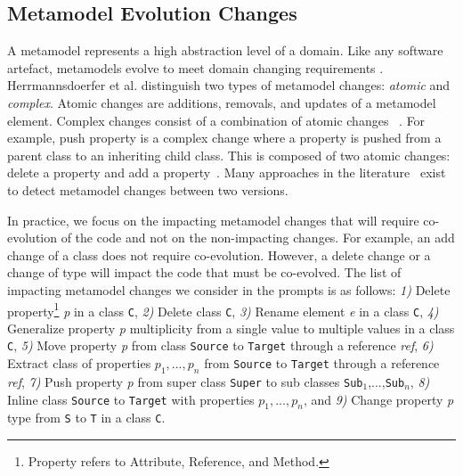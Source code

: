 \subsection{Metamodel Evolution Changes}
\label{mmchanges}
A metamodel represents a high abstraction level of a domain.
Like any software artefact, metamodels evolve to meet domain changing requirements \cite{mens2008introduction}.
Herrmannsdoerfer et al. \cite{Herrmannsdoerfer2011} distinguish two types of metamodel changes: \emph{atomic} and \emph{complex}. Atomic changes are additions, removals, and updates of a metamodel element. Complex changes consist of a combination of atomic changes ~\cite{vermolen2011reconstructing,khelladi2015detecting}. 
%
For example, push property is a complex change where a property is pushed from a parent class to an inheriting child class. This is composed of two atomic changes: delete a property and add a property~\cite{Herrmannsdoerfer2011}. 
Many approaches in the literature~\cite{Alter2015, williams2012searching,cicchetti2009managing,langer2013posteriori,vermolen2011reconstructing,Khelladi2016,bettini2022executable} exist to detect metamodel changes between two versions. 

In practice, we focus on the impacting metamodel changes that will require co-evolution of the code and not on the non-impacting changes. For example, an add change of a class does not require co-evolution. However, a delete change or a change of type will impact the code that must be co-evolved. 
The list of impacting metamodel changes \cite{iovino2012impact,cicchetti2009managing} we consider in the prompts is as follows: \emph{1)} Delete property\footnote{Property refers to Attribute, Reference, and Method.} \emph{p} in a class \texttt{C}, \emph{2)} Delete class \texttt{C}, \emph{3)} Rename element \emph{e} in a class \texttt{C}, \emph{4)} Generalize property \emph{p} multiplicity from a single value to multiple values in a class \texttt{C},  \emph{5)} Move property \emph{p} from class \texttt{Source} to \texttt{Target} through a reference \emph{ref},  \emph{6)} Extract class of properties $p_{1},...,p_{n}$ from \texttt{Source} to \texttt{Target} through a reference \emph{ref},  \emph{7)} Push property \emph{p} from super class \texttt{Super} to sub classes \texttt{Sub$_{1}$},...,\texttt{Sub$_{n}$}, \emph{8)} Inline class \texttt{Source} to \texttt{Target} with properties $p_{1},...,p_{n}$, and \emph{9)} Change property \emph{p} type from \texttt{S} to \texttt{T} in a class \texttt{C}. 

